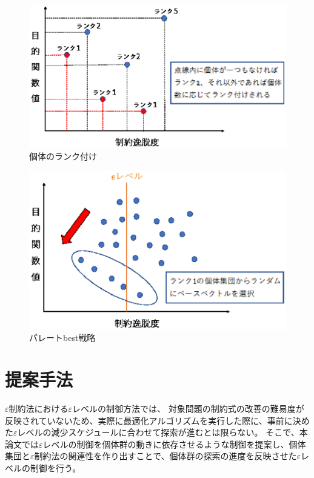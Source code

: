 \documentclass[a4paper,12pt]{jsreport}
\begin{document}
\begin{figure}[htbp]
  \centering
  \includegraphics[width=.9\linewidth]{fig3/paratebest2.eps}
  \caption{個体のランク付け}
  \label{fig:paratebest2}
\end{figure}

\begin{figure}[htbp]
  \centering
  \includegraphics[width=.9\linewidth]{fig3/paratebest.eps}
  \caption{パレートbest戦略}
  \label{fig:paratebest}
\end{figure}


\chapter{提案手法}

$\varepsilon$制約法における$\varepsilon$レベルの制御方法では、
対象問題の制約式の改善の難易度が反映されていないため、実際に最適化アルゴリズムを実行した際に、事前に決めた$\varepsilon$レベルの減少スケジュールに合わせて探索が進むとは限らない。
そこで、本論文では$\varepsilon$レベルの制御を個体群の動きに依存させるような制御を提案し、個体集団と$\varepsilon$制約法の関連性を作り出すことで、個体群の探索の進度を反映させた$\varepsilon$レベルの制御を行う。
\end{document}

